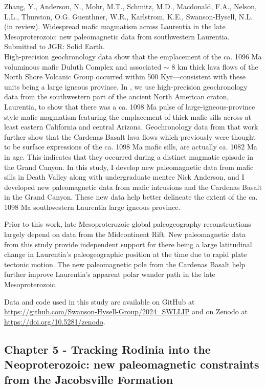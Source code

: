 \documentclass{ucbthesis}
\begin{document}
\begin{frontmatter}
\noindent Zhang, Y., Anderson, N., Mohr, M.T., Schmitz, M.D., Macdonald, F.A., Nelson, L.L., Thurston, O.G. Guenthner, W.R., Karlstrom, K.E., Swanson-Hysell, N.L. (in review). Widespread mafic magmatism across Laurentia in the late Mesoproterozoic: new paleomagnetic data from southwestern Laurentia. Submitted to JGR: Solid Earth. 
\\

High-precision geochronology data show that the emplacement of the ca. 1096 Ma voluminous mafic Duluth Complex and associated $\sim$ 8 km thick lava flows of the North Shore Volcanic Group occurred within 500 Kyr---consistent with these units being a large igneous province. In \cite{Mohr2024a}, we use high-precision geochronology data from the southwestern part of the ancient North American craton, Laurentia, to show that there was a ca. 1098 Ma pulse of large-igneous-province style mafic magmatism featuring the emplacement of thick mafic sills across at least eastern California and central Arizona. Geochronology data from that work further show that the Cardenas Basalt lava flows which previously were thought to be surface expressions of the ca. 1098 Ma mafic sills, are actually ca. 1082 Ma in age. This indicates that they occurred during a distinct magmatic episode in the Grand Canyon. In this study, I develop new paleomagnetic data from mafic sills in Death Valley along with undergraduate mentee Nick Anderson, and I developed new paleomagnetic data from mafic intrusions and the Cardenas Basalt in the Grand Canyon. These new data help better delineate the extent of the ca. 1098 Ma southwestern Laurentia large igneous province.

Prior to this work, late Mesoproterozoic global paleogeography reconstructions largely depend on data from the Midcontinent Rift. New paleomagnetic data from this study provide independent support for there being a large latitudinal change in Laurentia's paleogeographic position at the time due to rapid plate tectonic motion. The new paleomagnetic pole from the Cardenas Basalt help further improve Laurentia's apparent polar wander path in the late Mesoproterozoic.

Data and code used in this study are available on GitHub at \url{https://github.com/Swanson-Hysell-Group/2024_SWLLIP} and on Zenodo at \url{https://doi.org/10.5281/zenodo}.

\subsection{Chapter 5 - Tracking Rodinia into the Neoproterozoic: new paleomagnetic constraints from the Jacobsville Formation}


\end{frontmatter}
\end{document}
